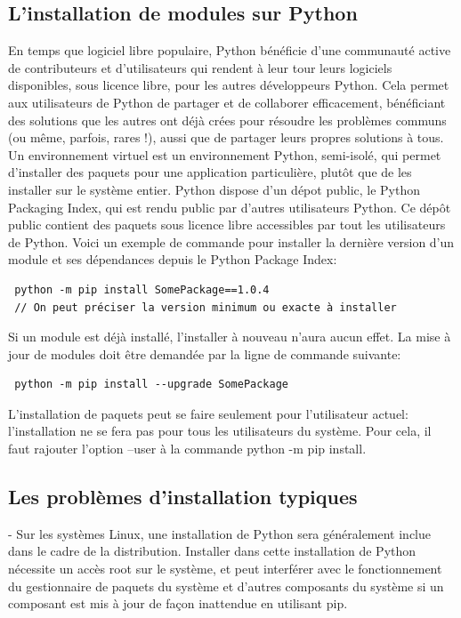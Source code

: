 \documentclass[a4paper,12pt]{article}
\begin{document}
\subsection{L'installation de modules sur Python}
En temps que logiciel libre populaire, Python bénéficie d’une communauté active de contributeurs et d’utilisateurs qui rendent à leur tour leurs logiciels disponibles, sous licence libre, pour les autres développeurs Python.
Cela permet aux utilisateurs de Python de partager et de collaborer efficacement, bénéficiant des solutions que les autres ont déjà crées pour résoudre les problèmes communs (ou même, parfois, rares !), aussi que de partager leurs propres solutions à tous.
Un environnement virtuel est un environnement Python, semi-isolé, qui permet d’installer des paquets pour une application particulière, plutôt que de les installer sur le système entier. Python dispose d'un dépot public, le Python Packaging Index, qui est rendu public par d'autres utilisateurs Python. Ce dépôt public contient des paquets sous licence libre accessibles par tout les utilisateurs de Python.
Voici un exemple de commande pour installer la dernière version d'un module et ses dépendances depuis le Python Package Index:

\begin{verbatim}
 python -m pip install SomePackage==1.0.4 
 // On peut préciser la version minimum ou exacte à installer
\end{verbatim}

Si un module est déjà installé, l'installer à nouveau n'aura aucun effet. La mise à jour de modules doit être demandée par la ligne de commande suivante:

\begin{verbatim}
 python -m pip install --upgrade SomePackage
\end{verbatim}
L'installation de paquets peut se faire seulement pour l'utilisateur actuel: l'installation ne se fera pas pour tous les utilisateurs du système. Pour cela, il faut rajouter l'option --user à la commande python -m pip install.

\subsection{Les problèmes d'installation typiques}
- Sur les systèmes Linux, une installation de Python sera généralement inclue dans le cadre de la distribution. Installer dans cette installation de Python nécessite un accès root sur le système, et peut interférer avec le fonctionnement du gestionnaire de paquets du système et d’autres composants du système si un composant est mis à jour de façon inattendue en utilisant pip.
\end{document}
